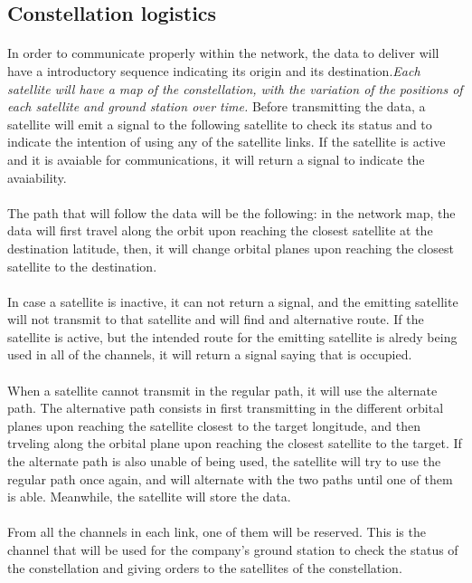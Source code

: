 \subsection{Constellation logistics}
\paragraph{}In order to communicate properly within the network, the data to deliver will have a introductory sequence indicating its origin and its destination.\textit{Each satellite will have a map of the constellation, with the variation of the positions of each satellite and ground station over time.} Before transmitting the data, a satellite will emit a signal to the following satellite to check its status and to indicate the intention of using any of the satellite links. If the satellite is active and it is avaiable for communications, it will return a signal to indicate the avaiability. 

\paragraph{}The path that will follow the data will be the following: in the network map, the data will first travel along the orbit upon reaching the closest satellite at the destination latitude, then, it will change orbital planes upon reaching the closest satellite to the destination.

\paragraph{}In case a satellite is inactive, it can not return a signal, and the emitting satellite will not transmit to that satellite and will find and alternative route. If the satellite is active, but the intended route for the emitting satellite is alredy being used in all of the channels, it will return a signal saying that is occupied.

\paragraph{}When a satellite cannot transmit in the regular path, it will use the alternate path. The alternative path consists in first transmitting in the different orbital planes upon reaching the satellite closest to the target longitude, and then trveling along the orbital plane upon reaching the closest satellite to the target. If the alternate path is also unable of being used, the satellite will try to use the regular path once again, and will alternate with the two paths until one of them is able. Meanwhile, the satellite will store the data.

\paragraph{}From all the channels in each link, one of them will be reserved. This is the channel that will be used for the company's ground station to check the status of the constellation and giving orders to the satellites of the constellation.